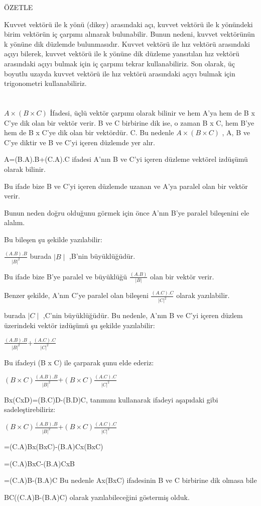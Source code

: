 \documentclass[12pt]{article}
\begin{document}
\bigbreak
ÖZETLE

Kuvvet vektörü ile k yönü (dikey) arasındaki açı, kuvvet vektörü ile k yönündeki birim vektörün iç çarpımı alınarak bulunabilir. Bunun nedeni, kuvvet vektörünün k yönüne dik düzlemde bulunmasıdır. Kuvvet vektörü ile hız vektörü arasındaki açıyı bilerek, kuvvet vektörü ile k yönüne dik düzleme yansıtılan hız vektörü arasındaki açıyı bulmak için iç çarpımı tekrar kullanabiliriz. Son olarak, üç boyutlu uzayda kuvvet vektörü ile hız vektörü arasındaki açıyı bulmak için trigonometri kullanabiliriz.
\newpage
\section{}
$A\times(B\times{C})$ İfadesi, üçlü vektör çarpımı olarak bilinir ve hem A'ya hem de B x C'ye dik olan bir vektör verir. B ve C birbirine dik ise, o zaman B x C, hem B'ye hem de B x C'ye dik olan bir vektördür. C. Bu nedenle $A\times(B\times{C})$ , A, B ve C'ye diktir ve B ve C'yi içeren düzlemde yer alır.

A=(B.A).B+(C.A).C ifadesi A'nın B ve C'yi içeren düzleme vektörel izdüşümü olarak bilinir.

Bu ifade bize B ve C'yi içeren düzlemde uzanan ve A'ya paralel olan bir vektör verir.

Bunun neden doğru olduğunu görmek için önce A'nın B'ye paralel bileşenini ele alalım. 

Bu bileşen şu şekilde yazılabilir:
\bigbreak

$\frac{(A.B).B}{|B|^2}$
\bigbreak
burada $\mid{B}\mid$ ,B'nin büyüklüğüdür.

Bu ifade bize B'ye paralel ve büyüklüğü $\frac{(A.B)}{|B|}$ olan bir vektör verir.

Benzer şekilde, A'nın C'ye paralel olan bileşeni $\frac{(A.C).C}{|C|^2}$ olarak yazılabilir. 

burada $\mid{C}\mid$ ,C'nin büyüklüğüdür.
\bigbreak
Bu nedenle, A'nın B ve C'yi içeren düzlem üzerindeki vektör izdüşümü şu şekilde yazılabilir:

$\frac{(A.B).B}{|B|^2}$+$\frac{(A.C).C}{|C|^2}$

Bu ifadeyi (B x C) ile çarparak şunu elde ederiz:

$(B\times{C})\frac{(A.B).B}{|B|^2}$+$(B\times{C})\frac{(A.C).C}{|C|^2}$

Bx(CxD)=(B.C)D-(B.D)C, tanımını kullanarak ifadeyi aşapıdaki gibi sadeleştirebiliriz:

$(B\times{C})\frac{(A.B).B}{|B|^2}$+$(B\times{C})\frac{(A.C).C}{|C|^2}$

=(C.A)Bx(BxC)-(B.A)Cx(BxC)

=(C.A)BxC-(B.A)CxB

=(C.A)B-(B.A)C
\bigbreak
Bu nedenle Ax(BxC) ifadesinin B ve C birbirine dik olmasa bile 

BC((C.A)B-(B.A)C) olarak yazılabileceğini göstermiş olduk.
\end{document}
